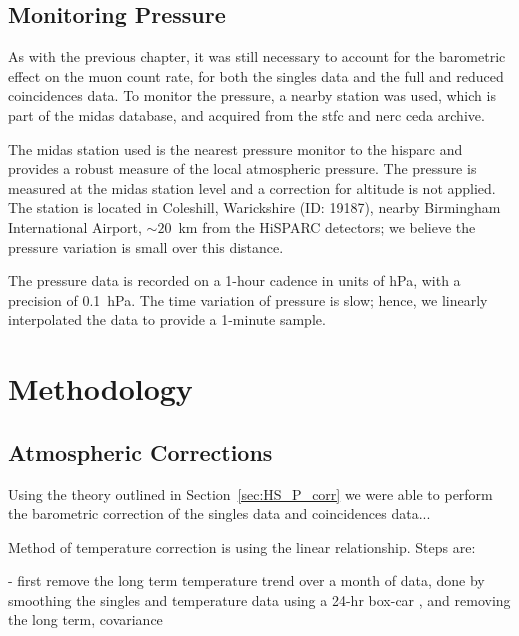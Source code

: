 \subsection{Monitoring Pressure}

As with the previous chapter, it was still necessary to account for the barometric effect on the muon count rate, for both the singles data and the full and reduced coincidences data. To monitor the pressure, a nearby station was used, which is part of the \gls{midas} database, and acquired from the \gls{stfc} and \gls{nerc} \gls{ceda} archive.

The \gls{midas} station used is the nearest pressure monitor to the \gls{hisparc} and provides a robust measure of the local atmospheric pressure. The pressure is measured at the \gls{midas} station level and a correction for altitude is not applied. The station is located in Coleshill, Warickshire (ID: 19187), nearby Birmingham International Airport, $\sim 20$~km from the HiSPARC detectors; we believe the pressure variation is small over this distance.

The pressure data is recorded on a 1-hour cadence in units of hPa, with a precision of 0.1~hPa. The time variation of pressure is slow; hence, we linearly interpolated the data to provide a 1-minute sample.


\section{Methodology}\label{sec:HS_14008_methods}

\subsection{Atmospheric Corrections}

Using the theory outlined in Section~\ref{sec:HS_P_corr} we were able to perform the barometric correction of the singles data and coincidences data...

Method of temperature correction is using the linear relationship. Steps are:

- first remove the long term temperature trend over a month of data, done by smoothing the singles and temperature data using a 24-hr box-car , and removing the long term, covariance

